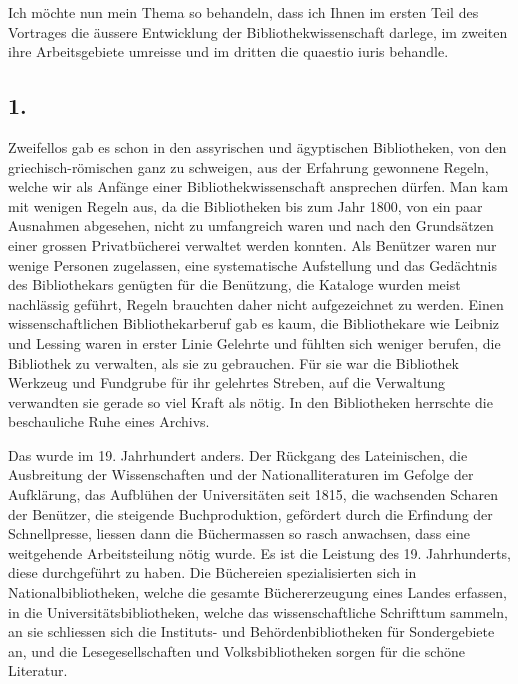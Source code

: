 \documentclass[a4paper,
fontsize=11pt,
oneside,
numbers=noperiodatend,
parskip=half-,
bibliography=totoc,
final
]{scrartcl}
\begin{document}
Ich möchte nun mein Thema so behandeln, dass ich Ihnen im ersten Teil
des Vortrages die äussere Entwicklung der Bibliothekwissenschaft
darlege, im zweiten ihre Arbeitsgebiete umreisse und im dritten die
quaestio iuris behandle.

\hypertarget{section}{%
\subsection{1.}\label{section}}

Zweifellos gab es schon in den assyrischen und ägyptischen Bibliotheken,
von den griechisch-römischen ganz zu schweigen, aus der Erfahrung
gewonnene Regeln, welche wir als Anfänge einer Bibliothekwissenschaft
ansprechen dürfen. Man kam mit wenigen Regeln aus, da die Bibliotheken
bis zum Jahr 1800, von ein paar Ausnahmen abgesehen, nicht zu
umfangreich waren und nach den Grundsätzen einer grossen Privatbücherei
verwaltet werden konnten. Als Benützer waren nur wenige Personen
zugelassen, eine systematische Aufstellung und das Gedächtnis des
Bibliothekars genügten für die Benützung, die Kataloge wurden meist
nachlässig geführt, Regeln brauchten daher nicht aufgezeichnet zu
werden. Einen wissenschaftlichen Bibliothekarberuf gab es kaum, die
Bibliothekare wie Leibniz und Lessing waren in erster Linie Gelehrte und
fühlten sich weniger berufen, die Bibliothek zu verwalten, als sie zu
gebrauchen. Für sie war die Bibliothek Werkzeug und Fundgrube für ihr
gelehrtes Streben, auf die Verwaltung verwandten sie gerade so viel
Kraft als nötig. In den Bibliotheken herrschte die beschauliche Ruhe
eines Archivs.

Das wurde im 19. Jahrhundert anders. Der Rückgang des Lateinischen, die
Ausbreitung der Wissenschaften und der Nationalliteraturen im Gefolge
der Aufklärung, das Aufblühen der Universitäten seit 1815, die
wachsenden Scharen der Benützer, die steigende Buchproduktion, gefördert
durch die Erfindung der Schnellpresse, liessen dann die Büchermassen so
rasch anwachsen, dass eine weitgehende Arbeitsteilung nötig wurde. Es
ist die Leistung des 19. Jahrhunderts, diese durchgeführt zu haben. Die
Büchereien spezialisierten sich in Nationalbibliotheken, welche die
gesamte Büchererzeugung eines Landes erfassen, in die
Universitätsbibliotheken, welche das wissenschaftliche Schrifttum
sammeln, an sie schliessen sich die Instituts- und Behördenbibliotheken
für Sondergebiete an, und die Lesegesellschaften und Volksbibliotheken
sorgen für die schöne Literatur.
\end{document}
